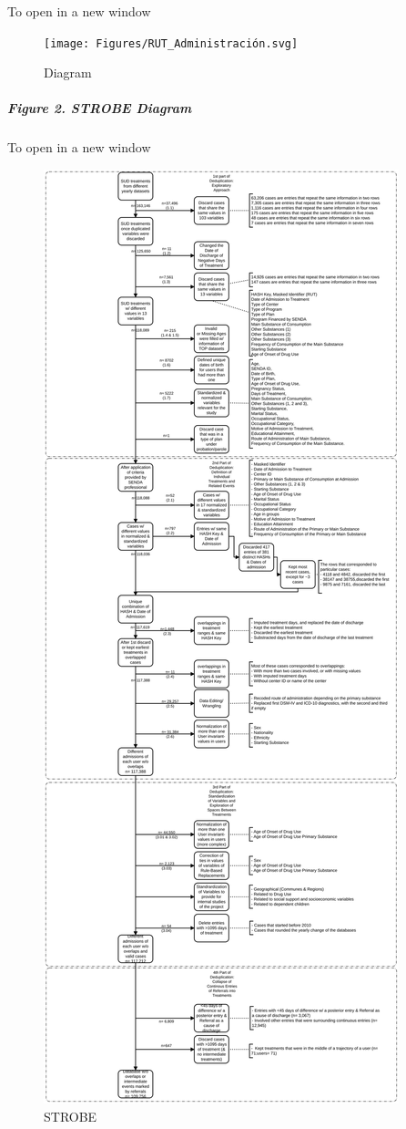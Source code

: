 \documentclass[
]{article}
\begin{document}
To open in a new window

\begin{figure}
\centering
\texttt{[image: Figures/RUT\_Administración.svg]}
\caption{Diagram}
\end{figure}

\hypertarget{figure-2.-strobe-diagram}{%
\subparagraph{Figure 2. STROBE Diagram}\label{figure-2.-strobe-diagram}}

To open in a new window

\begin{figure}
\centering
\includegraphics{Figures/Diagram_STROBE.svg}
\caption{STROBE}
\end{figure}
\end{document}
